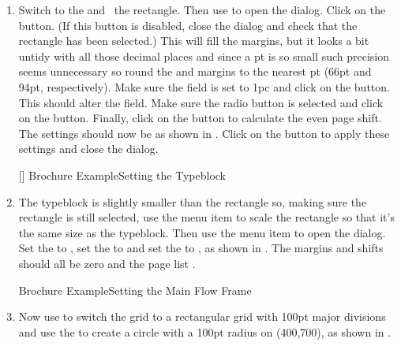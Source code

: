 \begin{enumerate}
\item Switch to the  and \select\ the rectangle. Then
use  to open the
 dialog. Click on the
 button. (If this button
is disabled, close the dialog and check that the rectangle has been
selected.) This will fill the margins, but it looks a bit untidy
with all those decimal places and since a \gls{pt} is so small such
precision seems unnecessary so round the
 and
 margins to the nearest
\gls{pt} (66\gls*{pt} and 94\gls*{pt}, respectively). Make sure
the  field is set to
1pc and click on the  button.
This should alter the  field.
Make sure the  radio button
is selected and click on the
 button. Finally, click on
the  button to calculate
the even page shift. The settings should now be as shown in
. Click on the  button to apply these
settings and close the dialog.

[]
{}
{Brochure Example\dash Setting the Typeblock}

\item The \gls{typeblock} is slightly smaller than the rectangle so,
making sure the rectangle is still selected, use the menu item
 to scale the rectangle so
that it's the same size as the \gls{typeblock}.  Then use the
 menu item to open the
 dialog. Set the  to
, set the  to
 and set the  to
, as shown in
. The margins and shifts should all be zero
and the page list .

{}
{Brochure Example\dash Setting the Main Flow Frame}

\item Now use  to switch the grid to a
rectangular grid with 100\gls{pt} major divisions and use the
 to create a circle with a 100\gls*{pt} radius
 on (400,700), as shown in
.


\end{enumerate}
